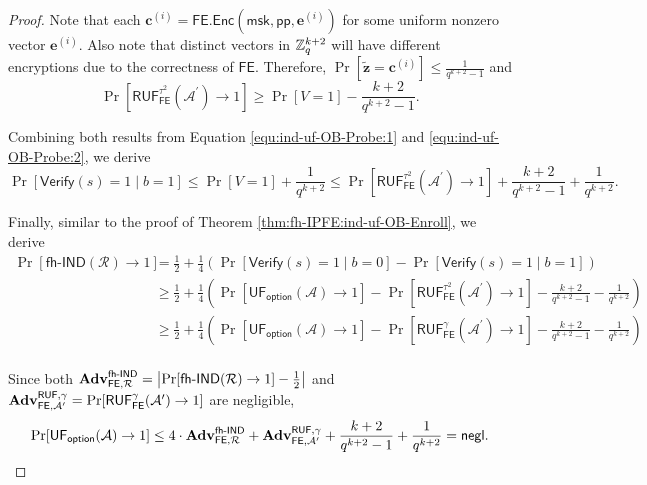 \begin{proof}
\noindent Note that each $\mathbf{c}^{(i)} = \textsf{FE.Enc}(\textsf{msk}, \textsf{pp}, \mathbf{e}^{(i)})$ for some uniform nonzero vector $\mathbf{e}^{(i)}$. Also note that distinct vectors in $\mathbb{Z}_q^{k+2}$ will have different encryptions due to the correctness of $\textsf{FE}$. Therefore, $\Pr[\mathbf{\tilde{z}} = \mathbf{c}^{(i)}] \leq \frac{1}{q^{k+2} - 1}$ and
\[
	\Pr[\textsf{RUF}_\textsf{FE}^{\tau^2}(\mathcal{A}^\prime) \to 1] \geq \Pr[V = 1] - \frac{k+2}{q^{k+2}-1}.
\]

\noindent Combining both results from Equation \ref{equ:ind-uf-OB-Probe:1} and \ref{equ:ind-uf-OB-Probe:2}, we derive
\[
	\Pr[\textsf{Verify}(s) = 1 \mid b = 1] \leq \Pr[V = 1] + \frac{1}{q^{k+2}} \leq \Pr[\textsf{RUF}_\textsf{FE}^{\tau^2}(\mathcal{A}^\prime) \to 1] + \frac{k+2}{q^{k+2}-1} + \frac{1}{q^{k+2}}.
\]

Finally, similar to the proof of Theorem \ref{thm:fh-IPFE:ind-uf-OB-Enroll}, we derive
\begin{align*}
	\Pr[\textsf{fh-IND}(\mathcal{R}) \to 1]
	&= \frac{1}{2} + \frac{1}{4} \left( \Pr[\textsf{Verify}(s) = 1 \mid b = 0] - \Pr[\textsf{Verify}(s) = 1 \mid b = 1] \right) \\
	&\geq \frac{1}{2} + \frac{1}{4} \left( \Pr[\textsf{UF}_\textsf{option}(\mathcal{A}) \to 1] - \Pr[\textsf{RUF}_\textsf{FE}^{\tau^2}(\mathcal{A}^\prime) \to 1] - \frac{k+2}{q^{k+2}-1} - \frac{1}{q^{k+2}} \right) \\
	&\geq \frac{1}{2} + \frac{1}{4} \left( \Pr[\textsf{UF}_\textsf{option}(\mathcal{A}) \to 1] - \Pr[\textsf{RUF}_\textsf{FE}^{\gamma}(\mathcal{A}^\prime) \to 1] - \frac{k+2}{q^{k+2}-1} - \frac{1}{q^{k+2}} \right) \\
\end{align*}

\noindent Since both $\mathbf{Adv}_{\textsf{FE}, \mathcal{R}}^\textsf{fh-IND} = \left| \Pr[\textsf{fh-IND}(\mathcal{R}) \to 1] - \frac{1}{2} \right|$ and $\mathbf{Adv}_{\textsf{FE}, \mathcal{A}^\prime}^{\textsf{RUF}, \gamma} = \Pr[\textsf{RUF}^\gamma_{\textsf{FE}}(\mathcal{A}^\prime) \to 1 ]$ are negligible,
\[
	\Pr[\textsf{UF}_\textsf{option}(\mathcal{A}) \to 1] \leq 4 \cdot \mathbf{Adv}_{\textsf{FE}, \mathcal{R}}^\textsf{fh-IND} + \mathbf{Adv}_{\textsf{FE}, \mathcal{A}^\prime}^{\textsf{RUF}, \gamma} + \frac{k+2}{q^{k+2}-1} + \frac{1}{q^{k+2}} = \mathsf{negl}.
\]

\end{proof}

